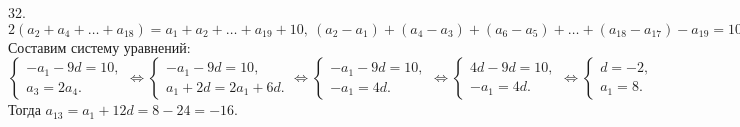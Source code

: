 32. $2(a_2+a_4+\ldots+a_{18})=a_1+a_2+\ldots+ a_{19}+10,\ (a_2-a_1)+(a_4-a_3)+(a_6-a_5)+\ldots+(a_{18}-a_{17})-a_{19}=10,\ -a_1-9d=10.$ Составим систему уравнений:
$\begin{cases} -a_1-9d=10,\\ a_{3}=2a_4.\end{cases}\Leftrightarrow
\begin{cases} -a_1-9d=10,\\ a_1+2d=2a_1+6d.\end{cases}\Leftrightarrow
\begin{cases} -a_1-9d=10,\\ -a_1=4d.\end{cases}\Leftrightarrow
\begin{cases} 4d-9d=10,\\ -a_1=4d.\end{cases}\Leftrightarrow
\begin{cases} d=-2,\\ a_1=8.\end{cases}$
Тогда $a_{13}=a_1+12d=8-24=-16.$\\
